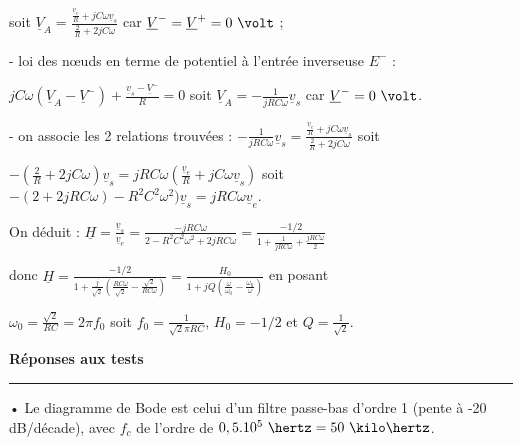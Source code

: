 \documentclass[a4paper,10pt]{article}
\def\d{\displaystyle}
\def\so{\underline}
\def\esp{\vspace{0.2cm}}
\def\noi{\noindent}
\begin{document}
soit $\d \so{V}_A = \frac{\frac{\so{v}_e}{R} + jC\omega \so{v}_s}{\frac{2}{R} + 2jC\omega}$ car $\so{V}^- = \so{V}^+ = 0\ \volt$ ;
\vspace{0.1cm}

- loi des nœuds en terme de potentiel à l'entrée inverseuse $E^-$ : 

\vspace{0.1cm} 
$\d jC\omega (\so{V}_A - \so{V}^-) + \frac{\so{v}_s - \so{V}^-}{R}  = 0$ soit $\d \so{V}_A = -\frac{1}{jRC\omega}\so{v}_s$ car $\so{V}^- = 0\ \volt$.
\vspace{0.1cm}

- on associe les 2 relations trouvées : $\d -\frac{1}{jRC\omega}\so{v}_s =  \frac{\frac{\so{v}_e}{R} + jC\omega \so{v}_s}{\frac{2}{R} + 2jC\omega}$ soit
\vspace{0.1cm}

$ -\left(\frac{2}{R} + 2jC\omega \right) \so{v}_s = jRC\omega \left(\frac{\so{v}_e}{R} +jC\omega \so{v}_s\right)$ soit $\d - (2 + 2jRC\omega) -R^2C^2\omega^2)\so{v}_s
 = jRC\omega \so{v}_e$.
 \vspace{0.1cm}
 
 On déduit : $\d \so{H} = \frac{\so{v}_s}{\so{v}_e} = \frac{-jRC\omega}{2-R^2C^2\omega^2 + 2jRC\omega} = \frac{-1/2}{1 + \frac{1}{jRC\omega} + \frac{jRC\omega}{2}}$
\vspace{0.1cm}

donc $\d \so{H} = \frac{-1/2}{1 + \frac{j}{\sqrt{2}}\left( \frac{RC\omega}{\sqrt{2}} -\frac{\sqrt{2}}{RC\omega}\right)} = \frac{H_0}{1 + jQ\left(\frac{\omega}{\omega_0}- \frac{\omega_0}{\omega}\right)}$ en posant
\vspace{0.1cm}

$\d \omega_0 = \frac{\sqrt{2}}{RC} = 2\pi f_0$ soit $\d f_0 = \frac{1}{\sqrt{2}\pi RC}$, $H_0 = -1/2$ et $Q = \frac{1}{\sqrt{2}}$.

\newpage


\begin{center}
\begin{LARGE}
\textbf{Réponses aux tests}
\end{LARGE}
\end{center}


\hspace{-0.5cm}\rule{\linewidth}{.5pt}

\esp
\noi
{}
\esp

\noi 
• Le diagramme de Bode est celui d'un filtre passe-bas d'ordre 1 (pente à -20 dB/décade), avec $f_c$ de l'ordre de $0,5.10^5\ \hertz = 50\ \kilo\hertz$.
\end{document}
